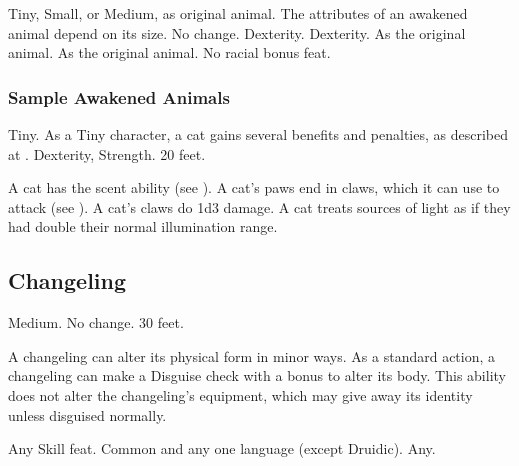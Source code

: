         Tiny, Small, or Medium, as original animal.
         The attributes of an awakened animal depend on its size.
         No change.
          Dexterity.
          Dexterity.
         As the original animal.
         As the original animal.
         No racial bonus feat.

        \subsubsection{Sample Awakened Animals}


             Tiny. As a Tiny character, a cat gains several benefits and penalties, as described at .
              Dexterity,  Strength.
             20 feet.
            \begin{itemize}
                 A cat has the scent ability (see ).
                 A cat's paws end in claws, which it can use to attack (see ). A cat's claws do 1d3 damage.
                 A cat treats sources of light as if they had double their normal illumination range.
            \end{itemize}

        \subsection{Changeling}

             Medium.
             No change.
             30 feet.
            \begin{itemize}
                 A changeling can alter its physical form in minor ways. As a standard action, a changeling can make a Disguise check with a  bonus to alter its body. This ability does not alter the changeling's equipment, which may give away its identity unless disguised normally.
            \end{itemize}
             Any Skill feat.
             Common and any one language (except Druidic).
             Any.


